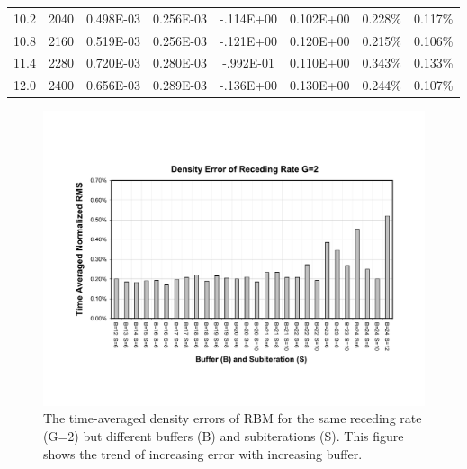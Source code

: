 \begin{table}[hbtp]
\begin{center}
\begin{tabular}{cccccccc}
 10.2 &  2040 & 0.498E-03 & 0.256E-03 & -.114E+00 & 0.102E+00 &   0.228\% &   0.117\%  \\
 10.8 &  2160 & 0.519E-03 & 0.256E-03 & -.121E+00 & 0.120E+00 &   0.215\% &   0.106\%  \\
 11.4 &  2280 & 0.720E-03 & 0.280E-03 & -.992E-01 & 0.110E+00 &   0.343\% &   0.133\%  \\
 12.0 &  2400 & 0.656E-03 & 0.289E-03 & -.136E+00 & 0.130E+00 &   0.244\% &   0.107\%  \\
 \hline
 \end{tabular}
 \label{tab:1}
 \end{center}
 \end{table}

\cp


\begin{figure}[htbp]
\vspace{1.5in}
  \begin{center}    \includegraphics[width=6.2in]{../figures/Exp3-CASE1-dt0.005/RBM-Den-Error-G2.pdf}
    \caption{The time-averaged density errors of RBM for the same receding rate (G=2) but different buffers (B) and subiterations (S). This figure shows the trend of increasing error with increasing buffer.}
    \label{fig:RBM-Den-Error-G2}
  \end{center}
\end{figure}



\cp

